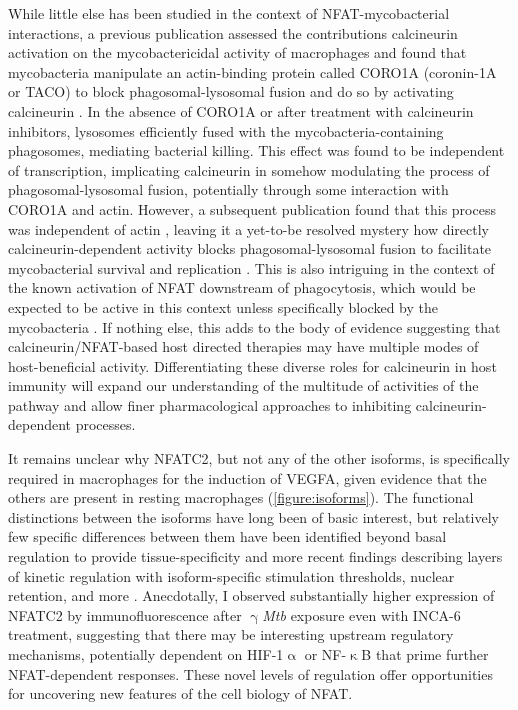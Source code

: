 While little else has been studied in the context of NFAT\hyp{}mycobacterial interactions, a previous publication assessed the contributions calcineurin activation on the mycobactericidal activity of macrophages and found that mycobacteria manipulate an actin\hyp{}binding protein called CORO1A (coronin\hyp{}1A or TACO) to block phagosomal\hyp{}lysosomal fusion and do so by activating calcineurin \citep{Jayachandran2007}. In the absence of CORO1A or after treatment with calcineurin inhibitors, lysosomes efficiently fused with the mycobacteria\hyp{}containing phagosomes, mediating bacterial killing. This effect was found to be independent of transcription, implicating calcineurin in somehow modulating the process of phagosomal\hyp{}lysosomal fusion, potentially through some interaction with CORO1A and actin. However, a subsequent publication found that this process was independent of actin \citep{Jayachandran2008}, leaving it a yet\hyp{}to\hyp{}be resolved mystery how directly calcineurin\hyp{}dependent activity blocks phagosomal\hyp{}lysosomal fusion to facilitate mycobacterial survival and replication \citep{Zimmerli1996}. This is also intriguing in the context of the known activation of NFAT downstream of phagocytosis, which would be expected to be active in this context unless specifically blocked by the mycobacteria \citep{Fric2014}. If nothing else, this adds to the body of evidence suggesting that calcineurin/NFAT\hyp{}based host directed therapies may have multiple modes of host\hyp{}beneficial activity. Differentiating these diverse roles for calcineurin in host immunity will expand our understanding of the multitude of activities of the pathway and allow finer pharmacological approaches to inhibiting calcineurin\hyp{}dependent processes.

It remains unclear why NFATC2, but not any of the other isoforms, is specifically required in macrophages for the induction of VEGFA, given evidence that the others are present in resting macrophages (\autoref{figure:isoforms}). The functional distinctions between the isoforms have long been of basic interest, but relatively few specific differences between them have been identified beyond basal regulation to provide tissue\hyp{}specificity and more recent findings describing layers of kinetic regulation with isoform\hyp{}specific stimulation thresholds, nuclear retention, and more \citep{Lyakh1997, Rao1997, Yissachar2013, Kar2014, Kar2015, Kar2016}. Anecdotally, I observed substantially higher expression of NFATC2 by immunofluorescence after $\upgamma$\textit{Mtb} exposure even with INCA\hyp{}6 treatment, suggesting that there may be interesting upstream regulatory mechanisms, potentially dependent on HIF\hyp{}1$\upalpha$ or NF\hyp{}$\upkappa$B that prime further NFAT\hyp{}dependent responses. These novel levels of regulation offer opportunities for uncovering new features of the cell biology of NFAT.

